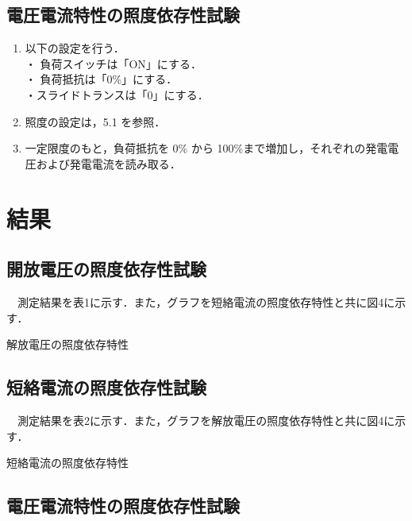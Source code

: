 \subsection{電圧電流特性の照度依存性試験}
\begin{enumerate}
  \item 以下の設定を行う．\\
  ・ 負荷スイッチは「ON」にする．\\
  ・ 負荷抵抗は「0\%」にする．\\
  ・スライドトランスは「0」にする．
  \item 照度の設定は，5.1 を参照．
  \item 一定限度のもと，負荷抵抗を 0\% から 100\%まで増加し，それぞれの発電電圧および発電電流を読み取る．
\end{enumerate}

\newpage
\section{結果}
\subsection{開放電圧の照度依存性試験}
　測定結果を表1に示す．また，グラフを短絡電流の照度依存特性と共に図4に示す．\\

\begin{table}[H]
  \centering
  \caption{解放電圧の照度依存特性}
  
\end{table}

\newpage
\subsection{短絡電流の照度依存性試験}
　測定結果を表2に示す．また，グラフを解放電圧の照度依存特性と共に図4に示す．\\

\begin{table}[H]
  \centering
  \caption{短絡電流の照度依存特性}
  

\end{table}


\subsection{電圧電流特性の照度依存性試験}


